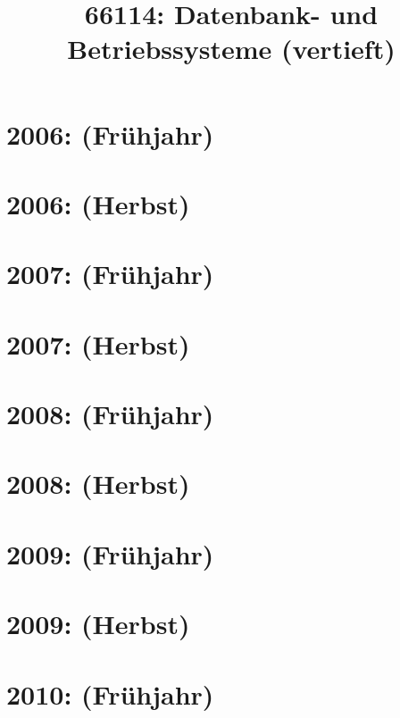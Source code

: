 \documentclass{lehramt-informatik-haupt}
\title{66114: Datenbank- und Betriebssysteme (vertieft)}
\begin{document}
\maketitle
\tableofcontents

\section{2006: (Frühjahr)}


\section{2006: (Herbst)}


\section{2007: (Frühjahr)}


\section{2007: (Herbst)}


\section{2008: (Frühjahr)}


\section{2008: (Herbst)}


\section{2009: (Frühjahr)}


\section{2009: (Herbst)}


\section{2010: (Frühjahr)}

\end{document}
